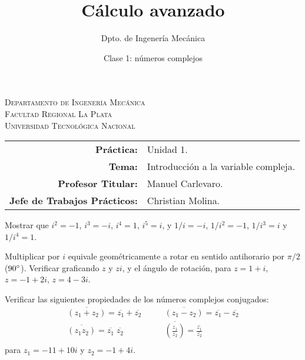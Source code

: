 \documentclass[11pt]{article}
\title{Cálculo avanzado}
\author{Dpto. de Ingenería Mecánica}
\date{Clase 1: números complejos}
\begin{document}

\begin{center}
\end{center} 

\begin{center}
\vspace{\baselineskip}
\Large{\textsc{Departamento de Ingenería Mecánica}} \\
\textsc{Facultad Regional La Plata} \\
\textsc{Universidad Tecnológica Nacional}
\end{center}


\begin{center}
\begin{tabular}{r l}
    \textbf{Práctica:} & Unidad 1. \\
 \textbf{Tema:} & Introducción a la variable compleja. \\
 \textbf{Profesor Titular:} & Manuel Carlevaro. \\
 \textbf{Jefe de Trabajos Prácticos:} & Christian Molina. \\
\end{tabular}\end{center}

\vspace{1em}

\begin{question} %
 Mostrar que $i^2 = -1$, $i^3 = -i$, $i^4 = 1$, $i^5 = i$, y $1/i = -i$, $1/i^2 = -1$, $1/i^3 = i$ y $1/i^4 = 1$.
\end{question}

\begin{question} %
 Multiplicar por $i$ equivale geométricamente a rotar en sentido antihorario por $\pi/2$ ($90\degree$). Verificar graficando $z$ y $zi$, y el ángulo de rotación, para $z = 1 + i$, $z = -1 + 2 i$, $z = 4 - 3 i$.
\end{question}

\begin{question} %
 Verificar las siguientes propiedades de los números complejos conjugados:
 \begin{align*}
  \overline{(z_1 + z_2)} = \overline{z_1} + \overline{z_2} &\qquad \overline{(z_1 - z_2)} = \overline{z_1} - \overline{z_2} \\
  \overline{(z_1 z_2)} = \overline{z_1} \; \overline{z_2} &\qquad \overline{ \left( \frac{z_1}{z_2} \right) } = \frac{\overline{z_1}}{\overline{z_2}} \\
 \end{align*}
 para $z_1 = -11 + 10 i$ y $z_2 = -1 + 4 i$.
\end{question}
\end{document}
